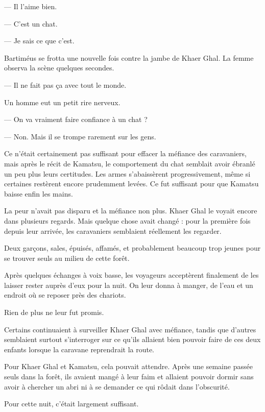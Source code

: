 — Il l'aime bien.

— C'est un chat.

— Je sais ce que c'est.

Bartiméus se frotta une nouvelle fois contre la jambe de Khaer Ghal. La femme
observa la scène quelques secondes.

— Il ne fait pas ça avec tout le monde.

Un homme eut un petit rire nerveux.

— On va vraiment faire confiance à un chat ?

— Non. Mais il se trompe rarement sur les gens.

Ce n'était certainement pas suffisant pour effacer la méfiance des
caravaniers, mais après le récit de Kamatsu, le comportement du chat semblait
avoir ébranlé un peu plus leurs certitudes. Les armes s'abaissèrent
progressivement, même si certaines restèrent encore prudemment levées. Ce fut
suffisant pour que Kamatsu baisse enfin les mains.


La peur n'avait pas disparu et la méfiance non plus. Khaer Ghal le voyait
encore dans plusieurs regards. Mais quelque chose avait changé : pour la
première fois depuis leur arrivée, les caravaniers semblaient réellement les
regarder.

Deux garçons, sales, épuisés, affamés, et probablement beaucoup trop jeunes
pour se trouver seuls au milieu de cette forêt.

Après quelques échanges à voix basse, les voyageurs acceptèrent finalement de
les laisser rester auprès d'eux pour la nuit. On leur donna à manger, de l'eau
et un endroit où se reposer près des chariots.

Rien de plus ne leur fut promis.

Certains continuaient à surveiller Khaer Ghal avec méfiance, tandis que
d'autres semblaient surtout s'interroger sur ce qu'ils allaient bien pouvoir
faire de ces deux enfants lorsque la caravane reprendrait la route.

Pour Khaer Ghal et Kamatsu, cela pouvait attendre. Après une semaine passée
seuls dans la forêt, ils avaient mangé à leur faim et allaient pouvoir dormir
sans avoir à chercher un abri ni à se demander ce qui rôdait dans
l'obscurité.

Pour cette nuit, c'était largement suffisant.